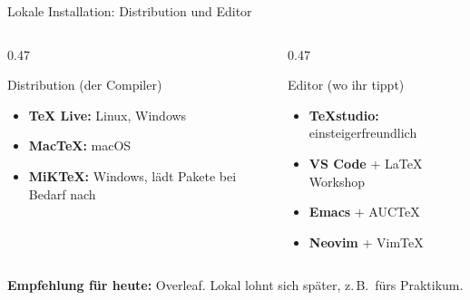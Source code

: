 \begin{frame}{Lokale Installation: Distribution und Editor}
  \begin{columns}[T]
    \begin{column}{0.47\textwidth}
      \begin{kasten}{Distribution (der Compiler)}
        \begin{itemize}
          \item \textbf{TeX Live:} Linux, Windows
          \item \textbf{MacTeX:} macOS
          \item \textbf{MiKTeX:} Windows, lädt Pakete bei Bedarf nach
        \end{itemize}
      \end{kasten}
    \end{column}
    \begin{column}{0.47\textwidth}
      \begin{kasten}{Editor (wo ihr tippt)}
        \begin{itemize}
          \item \textbf{TeXstudio:} einsteigerfreundlich
          \item \textbf{VS Code} + LaTeX Workshop
          \item \textbf{Emacs} + AUCTeX
          \item \textbf{Neovim} + VimTeX
        \end{itemize}
      \end{kasten}
    \end{column}
  \end{columns}
  \vspace{0.6em}
  \begin{merke}
    \textbf{Empfehlung für heute:} Overleaf. Lokal lohnt sich später, z.\,B.\ fürs Praktikum.
  \end{merke}
\end{frame}
